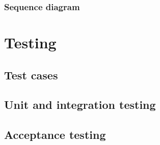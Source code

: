 \documentclass[10pt]{article}
\begin{document}
\subsubsection{Sequence diagram}

\section{Testing}
\subsection{Test cases}
\subsection{Unit and integration testing}
\subsection{Acceptance testing}



\end{document}
